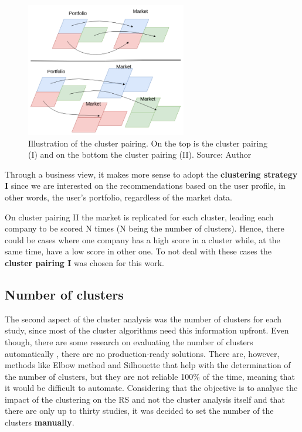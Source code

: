\begin{figure}[h]
   \centering
   \includegraphics[width=7cm]{fig/ch3-cluster-pairing.png}
   \caption{Illustration of the cluster pairing. On the top is the cluster pairing (I) and on the bottom the cluster pairing (II). Source: Author}
   \label{fig:cluster-pairing}
\end{figure}

Through a business view, it makes more sense to adopt the \textbf{clustering strategy I} since we are interested on the recommendations based on the user profile, in other words, the user's portfolio, regardless of the market data. 

On cluster pairing II the market is replicated for each cluster, leading each company to be scored N times (N being the number of clusters). Hence, there could be cases where one company has a high score in a cluster while, at the same time, have a low score in other one. To not deal with these cases the \textbf{cluster pairing I} was chosen for this work.

\subsection{Number of clusters}

The second aspect of the cluster analysis was the number of clusters for each study, since most of the cluster algorithms need this information upfront. Even though, there are some research on evaluating the number of clusters automatically \cite{yu2014automatic}, there are no production-ready solutions. There are, however, methods like Elbow method and Silhouette \cite{kodinariya2013review} that help with the determination of the number of clusters, but they are not reliable 100\% of the time, meaning that it would be difficult to automate. Considering that the objective is to analyse the impact of the clustering on the RS and not the cluster analysis itself and that there are only up to thirty studies, it was decided to set the number of the clusters \textbf{manually}.

